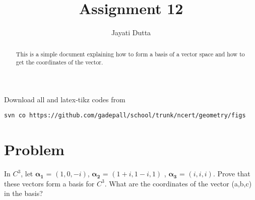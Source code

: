 \documentclass[journal,12pt,twocolumn]{IEEEtran}
\begin{document}
\let\StandardTheFigure\thefigure
\let\vec\mathbf
\renewcommand{\thefigure}{\theproblem}



\def\putbox#1#2#3{\makebox[0in][l]{\makebox[#1][l]{}\raisebox{\baselineskip}[0in][0in]{\raisebox{#2}[0in][0in]{#3}}}}
     \def\rightbox#1{\makebox[0in][r]{#1}}
     \def\centbox#1{\makebox[0in]{#1}}
     \def\topbox#1{\raisebox{-\baselineskip}[0in][0in]{#1}}
     \def\midbox#1{\raisebox{-0.5\baselineskip}[0in][0in]{#1}}

\vspace{3cm}


\title{Assignment 12}
\author{Jayati Dutta}





\maketitle

\newpage


\bigskip

\renewcommand{\thefigure}{\theenumi}
\renewcommand{\thetable}{\theenumi}


\begin{abstract}
This is a simple document explaining how to form a basis of a vector space and how to get the coordinates of the vector.
\end{abstract}

%

Download all and latex-tikz codes from 
%
\begin{lstlisting}
svn co https://github.com/gadepall/school/trunk/ncert/geometry/figs
\end{lstlisting}
%


\section{Problem}
In $C^3$, let $\vec{\alpha_1}$ = $(1,0,-i)$, $\vec{\alpha_2}$ = $(1+i,1-i,1)$ , $\vec{\alpha_3}$ = $(i,i,i)$. Prove that these vectors form a basis for $C^3$. What are the coordinates of the vector (a,b,c) in the basis?
\end{document}
